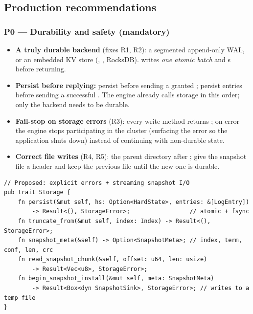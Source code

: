 \subsection{Production recommendations}

\subsubsection{P0 --- Durability and safety (mandatory)}

\begin{itemize}[nosep]
  \item \textbf{A truly durable backend} (fixes R1, R2): a segmented append-only WAL, or an embedded KV
    store (, , RocksDB).  writes \emph{one atomic batch}
    and s before returning.
  \item \textbf{Persist before replying:} persist  before sending a granted
    ; persist entries before sending a successful .
    The engine already calls storage in this order; only the backend needs to be durable.
  \item \textbf{Fail-stop on storage errors} (R3): every write method returns ; on error the
    engine stops participating in the cluster (surfacing the error so the application shuts down) instead of
    continuing with non-durable state.
  \item \textbf{Correct file writes} (R4, R5):  the parent directory after ; give
    the snapshot file a  header and keep the previous file until the
    new one is durable.
\end{itemize}

\begin{lstlisting}
// Proposed: explicit errors + streaming snapshot I/O
pub trait Storage {
    fn persist(&mut self, hs: Option<HardState>, entries: &[LogEntry])
        -> Result<(), StorageError>;                 // atomic + fsync
    fn truncate_from(&mut self, index: Index) -> Result<(), StorageError>;
    fn snapshot_meta(&self) -> Option<SnapshotMeta>; // index, term, conf, len, crc
    fn read_snapshot_chunk(&self, offset: u64, len: usize)
        -> Result<Vec<u8>, StorageError>;
    fn begin_snapshot_install(&mut self, meta: SnapshotMeta)
        -> Result<Box<dyn SnapshotSink>, StorageError>; // writes to a temp file
}
\end{lstlisting}

